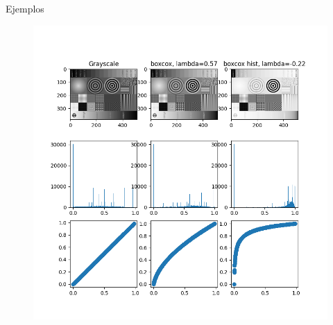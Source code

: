 \documentclass{beamer}
\begin{document}
\begin{frame}{Ejemplos}
\begin{figure}
    \centering
    \includegraphics[scale=0.3] {plot_I25.BMP.png  }
    \label{fig:my_label}
\end{figure}

\end{frame}
\end{document}
